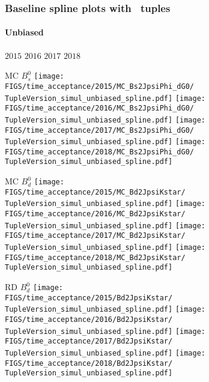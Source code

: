 \begin{frame} %
\frametitle{Baseline spline plots with \TupleVersion\, tuples}
\framesubtitle{Unbiased}

  \phantom{2020} \hspace*{1.5cm} $2015$ \hspace*{1.5cm} $2016$ \hspace*{1.5cm} $2017$ \hspace*{1.5cm} $2018$

  MC $B_s^0$
  \texttt{[image: \\FIGS/time\_acceptance/2015/MC\_Bs2JpsiPhi\_dG0/\\TupleVersion\_simul\_unbiased\_spline.pdf]}
  \texttt{[image: \\FIGS/time\_acceptance/2016/MC\_Bs2JpsiPhi\_dG0/\\TupleVersion\_simul\_unbiased\_spline.pdf]}
  \texttt{[image: \\FIGS/time\_acceptance/2017/MC\_Bs2JpsiPhi\_dG0/\\TupleVersion\_simul\_unbiased\_spline.pdf]}
  \texttt{[image: \\FIGS/time\_acceptance/2018/MC\_Bs2JpsiPhi\_dG0/\\TupleVersion\_simul\_unbiased\_spline.pdf]}
  \vspace*{2mm}

  MC $B_d^0$
  \texttt{[image: \\FIGS/time\_acceptance/2015/MC\_Bd2JpsiKstar/\\TupleVersion\_simul\_unbiased\_spline.pdf]}
  \texttt{[image: \\FIGS/time\_acceptance/2016/MC\_Bd2JpsiKstar/\\TupleVersion\_simul\_unbiased\_spline.pdf]}
  \texttt{[image: \\FIGS/time\_acceptance/2017/MC\_Bd2JpsiKstar/\\TupleVersion\_simul\_unbiased\_spline.pdf]}
  \texttt{[image: \\FIGS/time\_acceptance/2018/MC\_Bd2JpsiKstar/\\TupleVersion\_simul\_unbiased\_spline.pdf]}
  \vspace*{2mm}

  RD $B_d^0$
  \texttt{[image: \\FIGS/time\_acceptance/2015/Bd2JpsiKstar/\\TupleVersion\_simul\_unbiased\_spline.pdf]}
  \texttt{[image: \\FIGS/time\_acceptance/2016/Bd2JpsiKstar/\\TupleVersion\_simul\_unbiased\_spline.pdf]}
  \texttt{[image: \\FIGS/time\_acceptance/2017/Bd2JpsiKstar/\\TupleVersion\_simul\_unbiased\_spline.pdf]}
  \texttt{[image: \\FIGS/time\_acceptance/2018/Bd2JpsiKstar/\\TupleVersion\_simul\_unbiased\_spline.pdf]}

\end{frame} %







